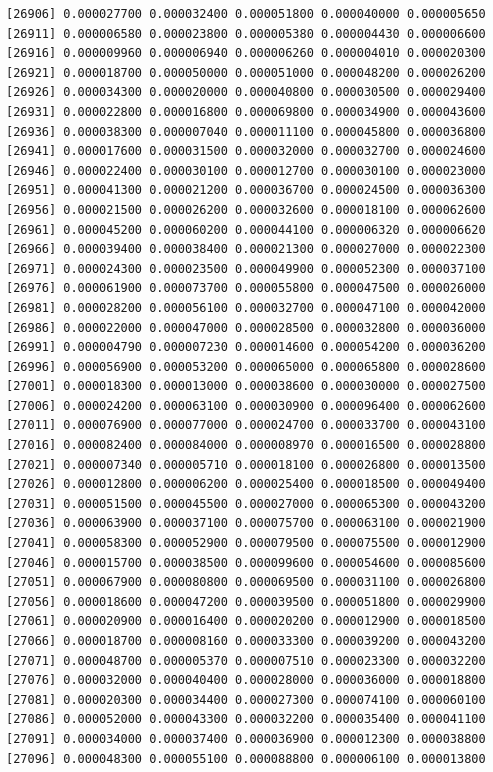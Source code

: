 \documentclass[]{article}
\begin{document}
\begin{verbatim}
[26906] 0.000027700 0.000032400 0.000051800 0.000040000 0.000005650
[26911] 0.000006580 0.000023800 0.000005380 0.000004430 0.000006600
[26916] 0.000009960 0.000006940 0.000006260 0.000004010 0.000020300
[26921] 0.000018700 0.000050000 0.000051000 0.000048200 0.000026200
[26926] 0.000034300 0.000020000 0.000040800 0.000030500 0.000029400
[26931] 0.000022800 0.000016800 0.000069800 0.000034900 0.000043600
[26936] 0.000038300 0.000007040 0.000011100 0.000045800 0.000036800
[26941] 0.000017600 0.000031500 0.000032000 0.000032700 0.000024600
[26946] 0.000022400 0.000030100 0.000012700 0.000030100 0.000023000
[26951] 0.000041300 0.000021200 0.000036700 0.000024500 0.000036300
[26956] 0.000021500 0.000026200 0.000032600 0.000018100 0.000062600
[26961] 0.000045200 0.000060200 0.000044100 0.000006320 0.000006620
[26966] 0.000039400 0.000038400 0.000021300 0.000027000 0.000022300
[26971] 0.000024300 0.000023500 0.000049900 0.000052300 0.000037100
[26976] 0.000061900 0.000073700 0.000055800 0.000047500 0.000026000
[26981] 0.000028200 0.000056100 0.000032700 0.000047100 0.000042000
[26986] 0.000022000 0.000047000 0.000028500 0.000032800 0.000036000
[26991] 0.000004790 0.000007230 0.000014600 0.000054200 0.000036200
[26996] 0.000056900 0.000053200 0.000065000 0.000065800 0.000028600
[27001] 0.000018300 0.000013000 0.000038600 0.000030000 0.000027500
[27006] 0.000024200 0.000063100 0.000030900 0.000096400 0.000062600
[27011] 0.000076900 0.000077000 0.000024700 0.000033700 0.000043100
[27016] 0.000082400 0.000084000 0.000008970 0.000016500 0.000028800
[27021] 0.000007340 0.000005710 0.000018100 0.000026800 0.000013500
[27026] 0.000012800 0.000006200 0.000025400 0.000018500 0.000049400
[27031] 0.000051500 0.000045500 0.000027000 0.000065300 0.000043200
[27036] 0.000063900 0.000037100 0.000075700 0.000063100 0.000021900
[27041] 0.000058300 0.000052900 0.000079500 0.000075500 0.000012900
[27046] 0.000015700 0.000038500 0.000099600 0.000054600 0.000085600
[27051] 0.000067900 0.000080800 0.000069500 0.000031100 0.000026800
[27056] 0.000018600 0.000047200 0.000039500 0.000051800 0.000029900
[27061] 0.000020900 0.000016400 0.000020200 0.000012900 0.000018500
[27066] 0.000018700 0.000008160 0.000033300 0.000039200 0.000043200
[27071] 0.000048700 0.000005370 0.000007510 0.000023300 0.000032200
[27076] 0.000032000 0.000040400 0.000028000 0.000036000 0.000018800
[27081] 0.000020300 0.000034400 0.000027300 0.000074100 0.000060100
[27086] 0.000052000 0.000043300 0.000032200 0.000035400 0.000041100
[27091] 0.000034000 0.000037400 0.000036900 0.000012300 0.000038800
[27096] 0.000048300 0.000055100 0.000088800 0.000006100 0.000013800

\end{verbatim}
\end{document}
